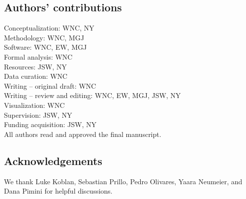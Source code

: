 \subsection*{Authors' contributions}
\noindent
Conceptualization: WNC, NY \\
Methodology: WNC, MGJ \\
Software: WNC, EW, MGJ \\
Formal analysis: WNC \\
Resources: JSW, NY \\
Data curation: WNC \\
Writing -- original draft: WNC \\
Writing -- review and editing: WNC, EW, MGJ, JSW, NY \\
Visualization: WNC \\
Supervision: JSW, NY \\
Funding acquisition: JSW, NY \\
All authors read and approved the final manuscript.

\subsection*{Acknowledgements}
We thank Luke Koblan, Sebastian Prillo, Pedro Olivares, Yaara Neumeier, and Dana Pimini for helpful discussions.
